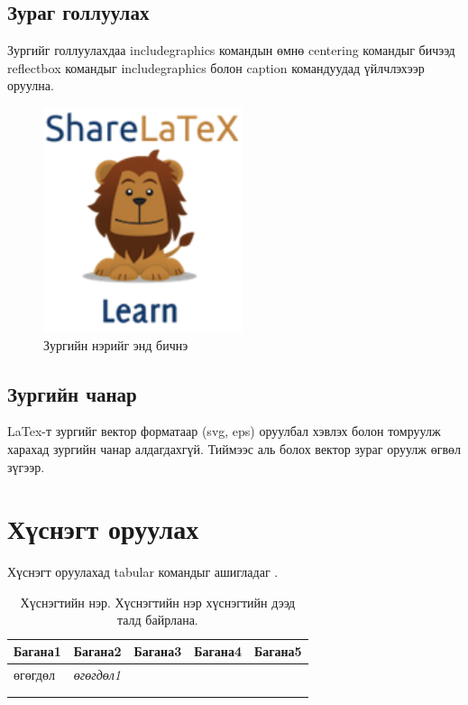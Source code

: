 \documentclass[12pt,A4]{report}
\begin{document}
\section{Зураг голлуулах}
Зургийг голлуулахдаа includegraphics командын өмнө centering
командыг бичээд reflectbox командыг includegraphics болон caption
командуудад үйлчлэхээр оруулна.

\begin{figure}[h]
	\includegraphics[scale=0.5]{figure01.png}
	\caption{Зургийн нэрийг энд бичнэ}

	\label{fig:lion2}
\end{figure}

\section{Зургийн чанар}
LaTex-т зургийг вектор форматаар (svg, eps) оруулбал хэвлэх болон томруулж харахад зургийн чанар
алдагдахгүй. Тиймээс аль болох вектор зураг оруулж өгвөл зүгээр.

\chapter{Хүснэгт оруулах}
Хүснэгт оруулахад tabular командыг ашигладаг \cite{table}.

\begin{table}[h]
	\centering
	\caption{Хүснэгтийн нэр. Хүснэгтийн нэр хүснэгтийн дээд талд байрлана. }
	\label{my-label}
	\begin{tabular}{|l|l|l|l|l|}
		\hline
		\textbf{Багана1} & \textbf{Багана2}  & \textbf{Багана3} & \textbf{Багана4} & \textbf{Багана5} \\ \hline
		өгөгдөл          & \textit{өгөгдөл1} &                  &                  &                  \\ \hline
		                 &                   &                  &                  &                  \\ \hline
		                 &                   &                  &                  &                  \\ \hline
	\end{tabular}
\end{table}
\end{document}
